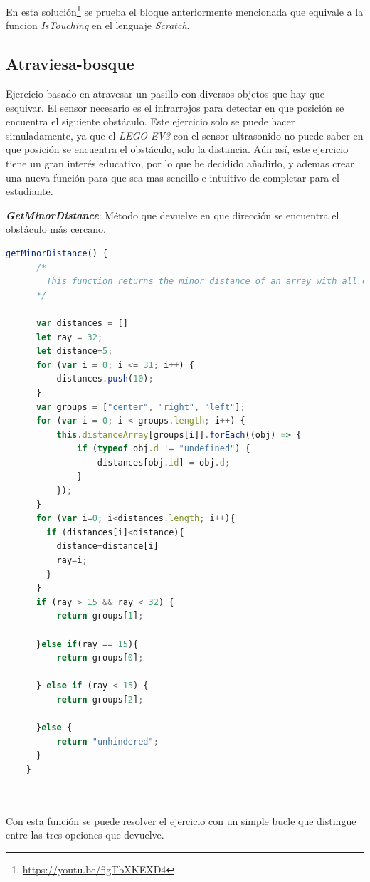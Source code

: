     En esta solución\footnote{\url{https://youtu.be/figTbXKEXD4}} se prueba el bloque anteriormente mencionada que equivale a la funcion \textit{IsTouching} en el lenguaje \textit{Scratch}.
    
\subsection{Atraviesa-bosque}
\label{subsec:atraviesabosque}
Ejercicio basado en atravesar un pasillo con diversos objetos que hay que esquivar. El sensor necesario es el infrarrojos para detectar en que posición se encuentra el siguiente obstáculo. Este ejercicio solo se puede hacer simuladamente, ya que el \textit{LEGO EV3} con el sensor ultrasonido no puede saber en que posición se encuentra el obstáculo, solo la distancia. Aún así, este ejercicio tiene un gran interés educativo, por lo que he decidido añadirlo, y ademas crear una nueva función para que sea mas sencillo e intuitivo de completar para el estudiante.

\textit{\textbf{GetMinorDistance}}: Método que devuelve en que dirección se encuentra el obstáculo más cercano. 

 \begin{lstlisting}[language=javascript]
 getMinorDistance() {
      /*
        This function returns the minor distance of an array with all distances
      */

      var distances = []
      let ray = 32;
      let distance=5;
      for (var i = 0; i <= 31; i++) {
          distances.push(10);
      }
      var groups = ["center", "right", "left"];
      for (var i = 0; i < groups.length; i++) {
          this.distanceArray[groups[i]].forEach((obj) => {
              if (typeof obj.d != "undefined") {
                  distances[obj.id] = obj.d;
              }
          });
      }
      for (var i=0; i<distances.length; i++){
        if (distances[i]<distance){
          distance=distance[i]
          ray=i;
        }
      }
      if (ray > 15 && ray < 32) {
          return groups[1];

      }else if(ray == 15){
          return groups[0];

      } else if (ray < 15) {
          return groups[2];

      }else {
          return "unhindered";
      }
    }
 
 
 \end{lstlisting}

Con esta función se puede resolver el ejercicio con un simple bucle que distingue entre las tres opciones que devuelve.


